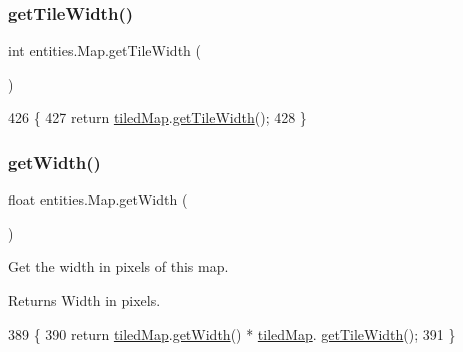 \subsubsection{\texorpdfstring{get\+Tile\+Width()}{getTileWidth()}}
{\footnotesize\ttfamily int entities.\+Map.\+get\+Tile\+Width (\begin{DoxyParamCaption}{ }\end{DoxyParamCaption})\hspace{0.3cm}{\ttfamily [inline]}}


\begin{DoxyCode}
426                              \{
427         \textcolor{keywordflow}{return} \mbox{\hyperlink{classentities_1_1_map_a94a743ccd80946422fcbdb5ba1cc966b}{tiledMap}}.\mbox{\hyperlink{classorg_1_1newdawn_1_1slick_1_1tiled_1_1_tiled_map_a44dd7389139c646e87d056fdd1e44232}{getTileWidth}}();
428     \}
\end{DoxyCode}
\mbox{\label{classentities_1_1_map_a7c15a6b2fac91bdb2592e1db1bc78623}} 
\subsubsection{\texorpdfstring{get\+Width()}{getWidth()}}
{\footnotesize\ttfamily float entities.\+Map.\+get\+Width (\begin{DoxyParamCaption}{ }\end{DoxyParamCaption})\hspace{0.3cm}{\ttfamily [inline]}}

Get the width in pixels of this map.

\begin{DoxyReturn}{Returns}
Width in pixels. 
\end{DoxyReturn}

\begin{DoxyCode}
389                             \{
390         \textcolor{keywordflow}{return} \mbox{\hyperlink{classentities_1_1_map_a94a743ccd80946422fcbdb5ba1cc966b}{tiledMap}}.\mbox{\hyperlink{classorg_1_1newdawn_1_1slick_1_1tiled_1_1_tiled_map_a1a8a716864f741b9f788138407108eb3}{getWidth}}() * \mbox{\hyperlink{classentities_1_1_map_a94a743ccd80946422fcbdb5ba1cc966b}{tiledMap}}.
      \mbox{\hyperlink{classorg_1_1newdawn_1_1slick_1_1tiled_1_1_tiled_map_a44dd7389139c646e87d056fdd1e44232}{getTileWidth}}();
391     \}
\end{DoxyCode}
\mbox{\label{classentities_1_1_map_a7caa160e4dd0164e861ad238cc58ac36}} 
